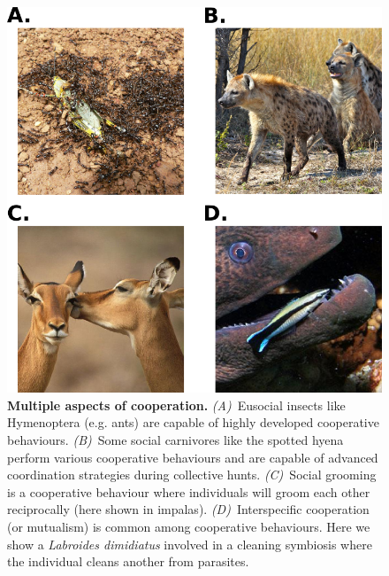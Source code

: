    

    \begin{figure}[hbt]
        \begin{center}
          \includegraphics[scale = 0.5]{fig/Intro/CooperationExamples.png}
          \caption{\textbf{Multiple aspects of cooperation.} {\em (A)}~Eusocial insects like Hymenoptera (e.g. ants) are capable of highly developed cooperative behaviours. {\em (B)}~Some social carnivores like the spotted hyena perform various cooperative behaviours and are capable of advanced coordination strategies during collective hunts. {\em (C)}~Social grooming is a cooperative behaviour where individuals will groom each other reciprocally (here shown in impalas). {\em (D)}~Interspecific cooperation (or mutualism) is common among cooperative behaviours. Here we show a \emph{Labroides dimidiatus} involved in a cleaning symbiosis where the individual cleans another from parasites.}
          \label{fig:CooperationExamples}
        \end{center}
    \end{figure}

